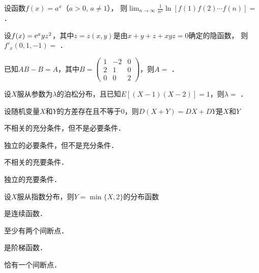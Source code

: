 \documentclass[plain,noanswer,medmath]{../../template/jnuexam}
\begin{document}






\begin{problem}
设函数$f(x) = a^x$（$a > 0$, $a \ne 1$），
则$\lim_{n \to \infty} \frac{1}{n^2}\ln[f(1)f(2) \cdots f(n)] =$ \fillin{}．
\end{problem}


\begin{problem}
设$f(x) = \mathrm{e}^x yz^2$，其中$z = z(x,y)$是由$x + y + z + xyz = 0$确定的隐函数，
则$f'_x(0,1, - 1) =$ \fillin{}．
\end{problem}




\begin{problem}
已知$AB - B = A$，其中$B = \begin{pmatrix}
  1 & -2 & 0 \\
  2 &  1 & 0 \\
  0 &  0 & 2
\end{pmatrix}$，则$A =$ \fillin{}．
\end{problem}


\begin{problem}
设$X$服从参数为$\lambda$的泊松分布，且已知$E[(X - 1)(X - 2)] = 1$，则$\lambda =$ \fillin{}．
\end{problem}










\begin{problem}
设随机变量$X$和$Y$的方差存在且不等于$0$，则$D(X + Y) = DX + DY$是$X$和$Y$\pickout{}
\begin{abcd}
\item 不相关的充分条件，但不是必要条件．
\item 独立的必要条件，但不是充分条件．
\item 不相关的充要条件．
\item 独立的充要条件．
\end{abcd}
\end{problem}


\begin{problem}
设$X$服从指数分布，则$Y = \min \{X,2\}$的分布函数\pickout{}
\begin{abcd}
\item 是连续函数．
\item 至少有两个间断点．
\item 是阶梯函数．
\item 恰有一个间断点．
\end{abcd}
\end{problem}
\end{document}
